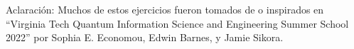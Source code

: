 \documentclass[a4paper,11pt,spanish]{article}
\begin{document}

\author{C. Cormick}


\\

\\

\vspace{5pt}

\noindent Aclaraci\'on: Muchos de estos ejercicios fueron tomados de o inspirados en ``Virginia Tech Quantum Information Science and Engineering Summer School 2022'' por Sophia E. Economou, Edwin Barnes, y Jamie Sikora.

\bigskip
\end{document}
